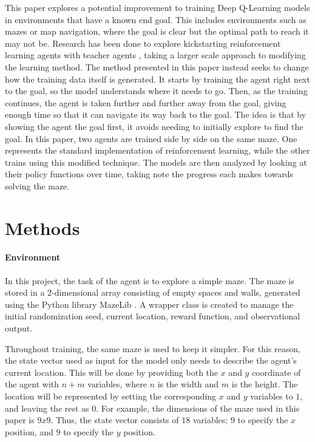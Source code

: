 \documentclass[12pt]{article}
\begin{document}
This paper explores a potential improvement to training Deep Q-Learning models in environments that have a known end goal.
This includes environments such as mazes or map navigation, where the goal is clear but the optimal path to reach it may not be.
Research has been done to explore kickstarting reinforcement learning agents with teacher agents \cite{article_kickstart_deep_reinforcement_learning}, taking a larger scale approach to modifying the learning method.
The method presented in this paper instead seeks to change how the training data itself is generated.
It starts by training the agent right next to the goal, so the model understands where it needs to go.
Then, as the training continues, the agent is taken further and further away from the goal, giving enough time so that it can navigate its way back to the goal.
The idea is that by showing the agent the goal first, it avoids needing to initially explore to find the goal.
In this paper, two agents are trained side by side on the same maze.
One represents the standard implementation of reinforcement learning, while the other trains using this modified technique.
The models are then analyzed by looking at their policy functions over time, taking note the progress each makes towards solving the maze.


\section{Methods}


\paragraph{Environment}

In this project, the task of the agent is to explore a simple maze.
The maze is stored in a 2-dimensional array consisting of empty spaces and walls, generated using the Python \cite{lang_python} library MazeLib \cite{lib_mazelib}.
A wrapper class is created to manage the initial randomization seed, current location, reward function, and observational output.

Throughout training, the same maze is used to keep it simpler.
For this reason, the state vector used as input for the model only needs to describe the agent's current location.
This will be done by providing both the $x$ and $y$ coordinate of the agent with $n + m$ variables, where $n$ is the width and $m$ is the height.
The location will be represented by setting the corresponding $x$ and $y$ variables to $1$, and leaving the rest as $0$.
For example, the dimensions of the maze used in this paper is $9x9$.
Thus, the state vector consists of $18$ variables; $9$ to specify the $x$ position, and $9$ to specify the $y$ position.
\end{document}
